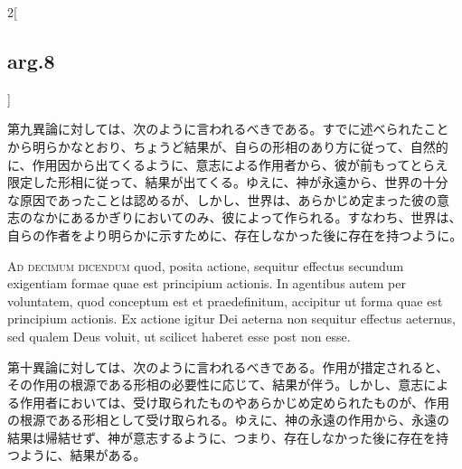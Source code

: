\documentclass[paper=a4paper,fontsize=10pt,jafontsize=9pt,titlepage]{jlreq}
\begin{document}
\begin{paracol}{2}[\subsection{arg.8}]
\switchcolumn


第九異論に対しては、次のように言われるべきである。すでに述べられたこと
から明らかなとおり、ちょうど結果が、自らの形相のあり方に従って、自然的
に、作用因から出てくるように、意志による作用者から、彼が前もってとらえ
限定した形相に従って、結果が出てくる。ゆえに、神が永遠から、世界の十分
な原因であったことは認めるが、しかし、世界は、あらかじめ定まった彼の意
志のなかにあるかぎりにおいてのみ、彼によって作られる。すなわち、世界は、
自らの作者をより明らかに示すために、存在しなかった後に存在を持つように。


\switchcolumn*[\subsection{ad.10}]


{\scshape Ad decimum dicendum} quod, posita actione, sequitur effectus secundum
 exigentiam formae quae est principium actionis. In agentibus autem per
 voluntatem, quod conceptum est et praedefinitum, accipitur ut forma
 quae est principium actionis. Ex actione igitur Dei aeterna non
 sequitur effectus aeternus, sed qualem Deus voluit, ut scilicet haberet
 esse post non esse.


\switchcolumn


第十異論に対しては、次のように言われるべきである。作用が措定されると、
その作用の根源である形相の必要性に応じて、結果が伴う。しかし、意志によ
る作用者においては、受け取られたものやあらかじめ定められたものが、作用
の根源である形相として受け取られる。ゆえに、神の永遠の作用から、永遠の
結果は帰結せず、神が意志するように、つまり、存在しなかった後に存在を持
つように、結果がある。


\switchcolumn*



\end{paracol}
\newpage
{}
\end{document}
